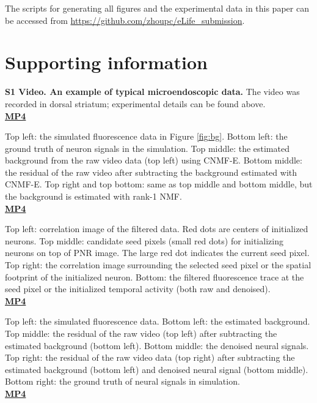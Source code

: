 \documentclass[9pt,lineno]{elife}
\begin{document}
The scripts for generating all figures and the experimental data in this paper can be accessed from \url{https://github.com/zhoupc/eLife_submission}\citep{Zhou2017scripts}. 
\section{Supporting information}
{\bf S1 Video. An example of typical microendoscopic data.}  The video was recorded in dorsal striatum; experimental details can be found above.\\
\href{http://www.columbia.edu/~pz2230/videos/example_microendoscopic_data.mp4}{\bf MP4}

 Top left: the simulated fluorescence data in Figure \ref{fig:bg}. Bottom left: the ground truth of neuron signals in the simulation. Top middle: the estimated background from the raw video data (top left) using CNMF-E. Bottom middle: the residual of the raw video after subtracting the background estimated with CNMF-E. Top right and top bottom: same as top middle and bottom middle, but the background is estimated with rank-1 NMF. \\
\href{http://www.columbia.edu/~pz2230/videos/background_comparison.mp4}{\bf MP4}

 Top left: correlation image of the filtered data. Red dots are centers of initialized neurons. Top middle: candidate seed pixels (small red dots) for initializing neurons on top of PNR image. The large red dot indicates the current seed pixel. Top right: the correlation image surrounding the selected seed pixel or the spatial footprint of the initialized neuron. Bottom: the filtered fluorescence trace at the seed pixel or the initialized temporal activity (both raw and denoised). \\
\href{http://www.columbia.edu/~pz2230/videos/sim_initialization.mp4}{\bf MP4}

 Top left: the simulated fluorescence data. Bottom left:  the estimated background. Top middle: the residual of the raw video (top left) after subtracting the estimated background (bottom left).  Bottom middle: the denoised neural signals. Top right: the residual of the raw video data (top right) after subtracting the estimated background (bottom left) and denoised neural signal (bottom middle). Bottom right: the ground truth of neural signals in simulation. \\
\href{http://www.columbia.edu/~pz2230/videos/sim_snr1_demixing.mp4}{\bf MP4}
\end{document}
